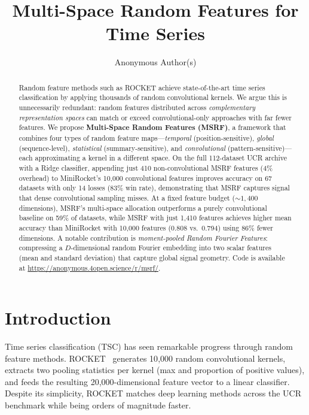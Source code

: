 \documentclass{article}
\title{Multi-Space Random Features for Time Series}
\author{
  Anonymous Author(s)
}
\begin{document}
\maketitle

\begin{abstract}
Random feature methods such as ROCKET achieve state-of-the-art time series classification by applying thousands of random convolutional kernels.
We argue this is unnecessarily redundant: random features distributed across \emph{complementary representation spaces} can match or exceed convolutional-only approaches with far fewer features.
We propose \textbf{Multi-Space Random Features (MSRF)}, a framework that combines four types of random feature maps---\emph{temporal} (position-sensitive), \emph{global} (sequence-level), \emph{statistical} (summary-sensitive), and \emph{convolutional} (pattern-sensitive)---each approximating a kernel in a different space.
On the full 112-dataset UCR archive with a Ridge classifier, appending just 410 non-convolutional MSRF features (4\% overhead) to MiniRocket's 10{,}000 convolutional features improves accuracy on 67 datasets with only 14 losses (83\% win rate), demonstrating that MSRF captures signal that dense convolutional sampling misses.
At a fixed feature budget (${\sim}1{,}400$ dimensions), MSRF's multi-space allocation outperforms a purely convolutional baseline on 59\% of datasets, while MSRF with just 1{,}410 features achieves higher mean accuracy than MiniRocket with 10{,}000 features (0.808 vs.\ 0.794) using 86\% fewer dimensions.
A notable contribution is \emph{moment-pooled Random Fourier Features}: compressing a $D$-dimensional random Fourier embedding into two scalar features (mean and standard deviation) that capture global signal geometry.
Code is available at \url{https://anonymous.4open.science/r/msrf/}.
\end{abstract}


\section{Introduction}

Time series classification (TSC) has seen remarkable progress through random feature methods.
ROCKET~\citep{dempster2020rocket} generates 10{,}000 random convolutional kernels, extracts two pooling statistics per kernel (max and proportion of positive values), and feeds the resulting 20{,}000-dimensional feature vector to a linear classifier.
Despite its simplicity, ROCKET matches deep learning methods across the UCR benchmark while being orders of magnitude faster.
\end{document}

